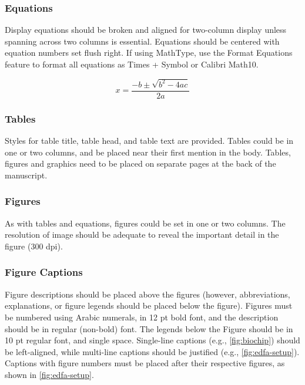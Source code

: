 \documentclass{siintec}
\begin{document}
\subsubsection{Equations}
Display equations should be broken and aligned for two-column display unless spanning across two columns is essential. Equations should be centered with equation numbers set flush right. If using MathType, use the Format Equations feature to format all equations as Times + Symbol  or Calibri Math10.

\begin{equation}
x = \frac{-b \pm \sqrt{b^2 - 4ac}}{2a}
\end{equation}

\subsubsection{Tables}
Styles for table title, table head, and table text are provided. Tables could be in one or two columns, and be placed near their first mention in the body. Tables, figures and graphics need to be placed on separate pages at the back of the manuscript.

\subsubsection{Figures}
As with tables and equations, figures could be set in one or two columns. The resolution of image should be adequate to reveal the important detail in the figure (300 dpi).

\subsubsection{Figure Captions}
Figure descriptions should be placed above the figures (however, abbreviations, explanations, or figure legends should be placed below the figure). Figures must be numbered using Arabic numerals, in 12 pt bold font, and the description should be in regular (non-bold) font. The legends below the Figure should be in 10 pt regular font, and single space. Single-line captions (e.g., \autoref{fig:biochip}) should be left-aligned, while multi-line captions should be justified (e.g., \autoref{fig:edfa-setup}). Captions with figure numbers must be placed after their respective figures, as shown in \autoref{fig:edfa-setup}.
\end{document}
